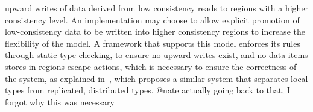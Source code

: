 \documentclass[preprint,numbers]{sigplanconf}
\begin{document}
upward writes of data derived from low
consistency reads to regions with a higher consistency level. An implementation may choose to
allow explicit promotion of low-consistency data to be written into higher
consistency regions to increase the flexibility of the model. A framework that
supports this model enforces its rules through static type checking, to ensure
no upward writes exist, and no data items stores in regions escape actions,
which is necessary to ensure the correctness of the system, as explained
in~\cite{burckhardt2012cloud}, which proposes a similar system that separates
local types from replicated, distributed types. {@nate actually going back to that, I forgot 
why this was necessary}
%


\end{document}
